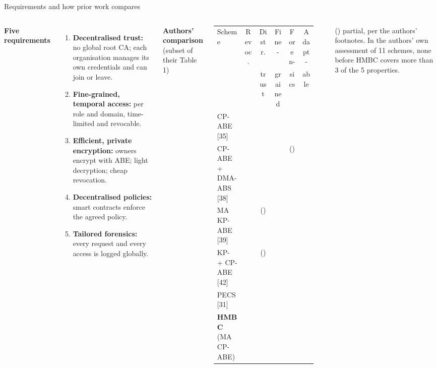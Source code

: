 \documentclass[aspectratio=169,10pt]{beamer}
\newcommand{\cmark}{\textcolor{okgreen}{\ding{51}}}
\newcommand{\xmark}{\textcolor{badred!80}{\ding{55}}}
\newcommand{\pmark}{\textcolor{okgreen!80}{(\ding{51})}}
\newcommand{\src}[1]{{\scriptsize\color{datagray}#1}}
\begin{document}
\begin{frame}{Requirements and how prior work compares}
\begin{columns}[T,onlytextwidth]
\footnotesize
\textbf{Five requirements}
\begin{enumerate}
  \item \textbf{Decentralised trust:} no global root CA; each organisation manages its own credentials and can join or leave.
  \item \textbf{Fine-grained, temporal access:} per role and domain, time-limited and revocable.
  \item \textbf{Efficient, private encryption:} owners encrypt with ABE; light decryption; cheap revocation.
  \item \textbf{Decentralised policies:} smart contracts enforce the agreed policy.
  \item \textbf{Tailored forensics:} every request and every access is logged globally.
\end{enumerate}

\centering
\footnotesize\textbf{Authors' comparison} \src{(subset of their Table 1)}\\[0.5em]
\setlength{\tabcolsep}{3pt}
\scriptsize
\begin{tabular}{@{}lccccc@{}}
\toprule
Scheme & Revoc. & Distr.\ & Fine- & Foren- & Adapt- \\
       &        & trust   & grained & sics & able \\
\midrule
CP-ABE \src{[35]}           & \xmark & \xmark & \cmark & \xmark & \xmark \\
CP-ABE + DMA-ABS \src{[38]} & \xmark & \xmark & \cmark & \pmark & \xmark \\
MA KP-ABE \src{[39]}        & \xmark & \pmark & \cmark & \xmark & \cmark \\
KP- + CP-ABE \src{[42]}     & \cmark & \pmark & \cmark & \xmark & \xmark \\
PECS \src{[31]}             & \cmark & \xmark & \xmark & \xmark & \cmark \\
\midrule
\textbf{HMBC} (MA CP-ABE)   & \cmark & \cmark & \cmark & \cmark & \cmark \\
\bottomrule
\end{tabular}\\[0.6em]
\raggedright\tiny\color{datagray}
() partial, per the authors' footnotes. In the authors' own assessment of 11 schemes, none before HMBC covers more than 3 of the 5 properties.
\end{columns}
\end{frame}
\end{document}

